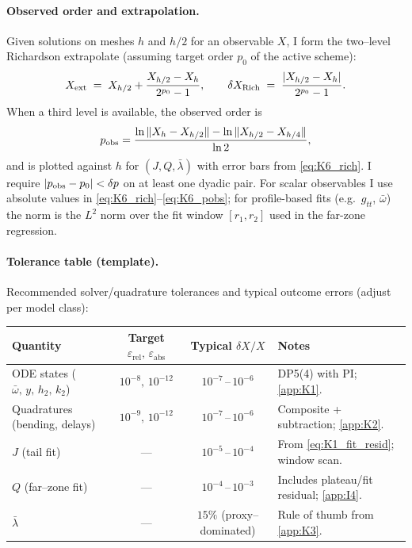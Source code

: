 \documentclass{iopjournal}
\begin{document}
\paragraph{Observed order and extrapolation.}
Given solutions on meshes $h$ and $h/2$ for an observable $X$, I form the two–level Richardson extrapolate (assuming target order $p_0$ of the active scheme):
\begin{equation}
X_{\rm ext}\;=\;X_{h/2}+\frac{X_{h/2}-X_{h}}{2^{p_0}-1},
\qquad
\delta X_{\rm Rich}\;=\;\frac{|X_{h/2}-X_{h}|}{2^{p_0}-1}.
\label{eq:K6_rich}
\end{equation}
When a third level is available, the observed order is
\begin{equation}
p_{\rm obs}
=\frac{\ln\|X_{h}-X_{h/2}\|-\ln\|X_{h/2}-X_{h/4}\|}{\ln 2},
\label{eq:K6_pobs}
\end{equation}
and is plotted against $h$ for $(J,Q,\bar\lambda)$ with error bars from \eqref{eq:K6_rich}. I require $|p_{\rm obs}-p_0|<\delta p$ on at least one dyadic pair.
For scalar observables I use absolute values in \eqref{eq:K6_rich}–\eqref{eq:K6_pobs}; for profile-based fits (e.g.\ $g_{tt}$, $\bar\omega$) the norm is the $L^{2}$ norm over the fit window $[r_1,r_2]$ used in the far-zone regression.


\paragraph{Tolerance table (template).}
Recommended solver/quadrature tolerances and typical outcome errors (adjust per model class):
\begin{table}[t]
\centering
{%
  \setlength{\tabcolsep}{4pt}%
  \renewcommand{\arraystretch}{1.25}%
  \begin{tabularx}{\linewidth}{@{} l c c Y @{}}
  \toprule
  Quantity & Target $\varepsilon_{\mathrm{rel}},\,\varepsilon_{\mathrm{abs}}$ & Typical $\delta X/X$ & Notes \\
  \midrule
  ODE states ($\bar\omega,\,y,\,h_2,\,k_2$)   & $10^{-8},\,10^{-12}$ & $10^{-7}\,\text{--}\,10^{-6}$ & DP5(4) with PI; \cref{app:K1}. \\
  Quadratures (bending, delays)               & $10^{-9},\,10^{-12}$ & $10^{-7}\,\text{--}\,10^{-6}$ & Composite + subtraction; \cref{app:K2}. \\
  $J$ (tail fit)                              & ---                  & $10^{-5}\,\text{--}\,10^{-4}$ & From \eqref{eq:K1_fit_resid}; window scan. \\
  $Q$ (far--zone fit)                         & ---                  & $10^{-4}\,\text{--}\,10^{-3}$ & Includes plateau/fit residual; \cref{app:I4}. \\
  $\bar\lambda$                               & ---                  & $15\%$ (proxy--dominated)     & Rule of thumb from \cref{app:K3}. \\
  \bottomrule
  \end{tabularx}%
}
\end{table}
\end{document}
